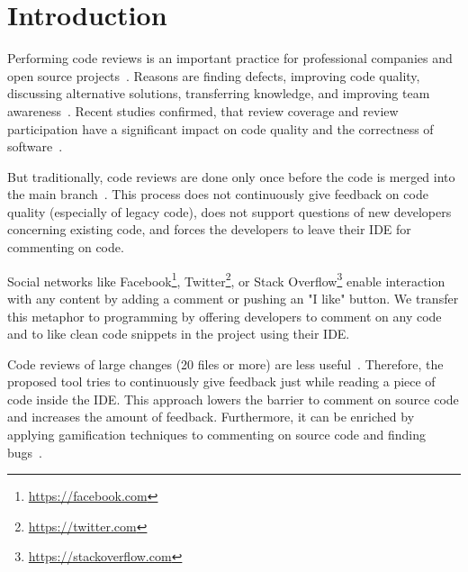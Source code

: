 
\section{Introduction}
Performing code reviews is an important practice for professional companies and open source projects~\cite{balachandran2013PeerCodeReviews, bird2015CodeReviewPlatform, rigby2013PeerCodeReviews, czerwonka2015codereviews, rigby2014PeerReviewOSS, feitelson2013development}.
%
Reasons are finding defects, improving code quality, discussing alternative solutions, transferring knowledge, and improving team awareness~\cite{rigby2013PeerCodeReviews, bacchelli2013expectations}.
%
Recent studies confirmed, that review coverage and review participation have a significant impact on code quality and the correctness of software~\cite{mcintosh2014impact, mcintosh2016empirical, thongtanunam2015CodeReviews, shimagaki2016CRInSony}. 
%

%
But traditionally, code reviews are done only once before the code is merged into the main branch~\cite{rigby2013PeerCodeReviews}. 
%
This process does not continuously give feedback on code quality (especially of legacy code), does not support questions of new developers concerning existing code, and forces the developers to leave their IDE for commenting on code.
%

%
Social networks like Facebook\footnote{\url{https://facebook.com}}, Twitter\footnote{\url{https://twitter.com}}, or Stack Overflow\footnote{\url{https://stackoverflow.com}} enable interaction with any content by adding a comment or pushing an "I like" button.
% 
We transfer this metaphor to programming by offering developers to comment on any code and to like clean code snippets in the project using their IDE.  
%

%
Code reviews of large changes (20 files or more) are less useful~\cite{czerwonka2015codereviews}.
%
Therefore, the proposed tool tries to continuously give feedback just while reading a piece of code inside the IDE. 
%
This approach lowers the barrier to comment on source code and increases the amount of feedback.
%
Furthermore, it can be enriched by applying gamification techniques to commenting on source code and finding bugs~\cite{lotufo2012towards}.
%